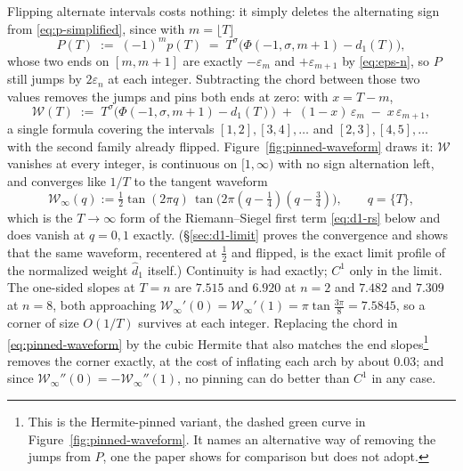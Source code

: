 \documentclass[11pt]{article}
\theoremstyle{definition}
\begin{document}
Flipping alternate intervals costs nothing: it simply deletes
the alternating sign from \eqref{eq:p-simplified}, since with
$m=\lfloor T\rfloor$
\begin{equation}\label{eq:p-flipped}
P(T)\;:=\;(-1)^{m}p(T)\;=\;T^{\sigma}\bigl(\Phi(-1,\sigma,m+1)-d_1(T)\bigr),
\end{equation}
whose two ends on $[m,m+1]$ are exactly $-\varepsilon_m$ and
$+\varepsilon_{m+1}$ by \eqref{eq:eps-n}, so $P$ still jumps by
$2\varepsilon_n$ at each integer. Subtracting the chord between those two
values removes the jumps and pins both ends at zero: with $x=T-m$,
\begin{equation}\label{eq:pinned-waveform}
\mathcal{W}(T)\;:=\;T^{\sigma}\bigl(\Phi(-1,\sigma,m+1)-d_1(T)\bigr)
\;+\;(1-x)\,\varepsilon_{m}\;-\;x\,\varepsilon_{m+1},
\end{equation}
a single formula covering the intervals $[1,2],[3,4],\dots$ and
$[2,3],[4,5],\dots$ with the second family already flipped.
Figure~\ref{fig:pinned-waveform} draws it: $\mathcal{W}$ vanishes at every
integer, is continuous on $[1,\infty)$ with no sign alternation left, and
converges like $1/T$ to the tangent waveform
\begin{equation}\label{eq:W-infty}
\mathcal{W}_{\infty}(q):=\tfrac12\tan(2\pi q)\,
\tan\bigl(2\pi(q-\tfrac14)(q-\tfrac34)\bigr),
\qquad q=\{T\},
\end{equation}
which is the $T\to\infty$ form of the Riemann--Siegel first term
\eqref{eq:d1-rs} below and does vanish at $q=0,1$ exactly. (\S\ref{sec:d1-limit} proves the convergence
and shows that the same waveform, recentered at $\tfrac12$ and flipped, is
the exact limit profile of the normalized weight $\hat d_1$ itself.) Continuity is had exactly; $C^{1}$ only in the
limit. The one-sided slopes at $T=n$ are $7.515$ and $6.920$ at $n=2$ and
$7.482$ and $7.309$ at $n=8$, both approaching
$\mathcal{W}_{\infty}'(0)=\mathcal{W}_{\infty}'(1)=\pi\tan\tfrac{3\pi}{8}
=7.5845$, so a corner of size $O(1/T)$ survives at each integer. Replacing the
chord in \eqref{eq:pinned-waveform} by the cubic Hermite that also matches the
end slopes\footnote{This is the Hermite-pinned variant, the dashed green
curve in Figure~\ref{fig:pinned-waveform}. It names an alternative way of
removing the jumps from $P$, one the paper shows for comparison but does not
adopt.} removes the corner exactly, at the cost of inflating each arch by
about $0.03$; and since
$\mathcal{W}_{\infty}''(0)=-\mathcal{W}_{\infty}''(1)$, no pinning can do
better than $C^{1}$ in any case.
\end{document}
